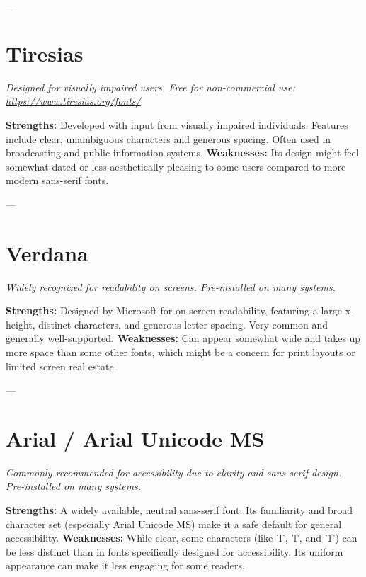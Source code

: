 ---
\pagebreak
\section{Tiresias}
\emph{Designed for visually impaired users. Free for non-commercial use: \url{https://www.tiresias.org/fonts/}}
\begin{raggedright}
\textbf{Strengths:} Developed with input from visually impaired individuals. Features include clear, unambiguous characters and generous spacing. Often used in broadcasting and public information systems.
\textbf{Weaknesses:} Its design might feel somewhat dated or less aesthetically pleasing to some users compared to more modern sans-serif fonts.

\FontSample{\tiresiasfont}
\end{raggedright}

---
\pagebreak
\section{Verdana}
\emph{Widely recognized for readability on screens. Pre-installed on many systems.}
\begin{raggedright}
\textbf{Strengths:} Designed by Microsoft for on-screen readability, featuring a large x-height, distinct characters, and generous letter spacing. Very common and generally well-supported.
\textbf{Weaknesses:} Can appear somewhat wide and takes up more space than some other fonts, which might be a concern for print layouts or limited screen real estate.

\FontSample{\verdanafont}
\end{raggedright}

---
\pagebreak
\section{Arial / Arial Unicode MS}
\emph{Commonly recommended for accessibility due to clarity and sans-serif design. Pre-installed on many systems.}
\begin{raggedright}
\textbf{Strengths:} A widely available, neutral sans-serif font. Its familiarity and broad character set (especially Arial Unicode MS) make it a safe default for general accessibility.
\textbf{Weaknesses:} While clear, some characters (like 'I', 'l', and '1') can be less distinct than in fonts specifically designed for accessibility. Its uniform appearance can make it less engaging for some readers.

\FontSample{\arialfont}
\end{raggedright}

